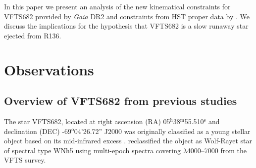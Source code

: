 \documentclass[apjl,twocolumn]{emulateapj}
\DeclareRobustCommand{\Tabref}[1]{Table~\ref{#1}}
\begin{document}

In this paper we present an analysis of the new kinematical
constraints for VFTS682 provided by \emph{Gaia} DR2 and constraints
from HST proper data  by \citet{platais:18}.   We discuss the
implications for the hypothesis that VFTS682 is a slow runaway star
ejected from R136.




\section{Observations}
\label{sec:sample}

\subsection{ Overview of VFTS682 from previous studies \label{data:vfts683}}

The star VFTS682, located at right ascension (RA)
05$^\mathrm{h}$38$^\mathrm{m}$55.510$^\mathrm{s}$  and declination
(DEC) \mbox{-69$^\mathrm{o}$04'26.72''} J2000 \citep[][%
]{evans:11}
was originally classified as a young stellar object based on its
mid-infrared excess \citep{gruendl:09}. \citet{evans:11} reclassified the
object as Wolf-Rayet star of spectral type WNh5 using multi-epoch
spectra covering $\lambda$4000--7000 from the
VFTS survey. %
\end{document}
